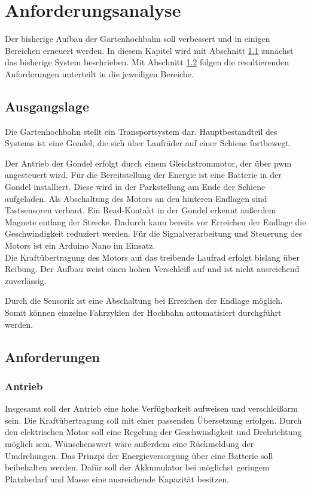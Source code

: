 \chapter{Anforderungsanalyse}
Der bisherige Aufbau der Gartenhochbahn soll verbessert und in einigen Bereichen erneuert werden. 
In diesem Kapitel wird mit Abschnitt \ref{sec:ausgangslage}
 zunächst das bisherige System beschrieben. 
Mit Abschnitt \ref{sec:anforderungen} folgen die resultierenden Anforderungen unterteilt in die jeweiligen Bereiche.  

\section{Ausgangslage}
\label{sec:ausgangslage}
Die Gartenhochbahn stellt ein Transportsystem dar. Hauptbestandteil des Systems ist eine Gondel, die sich über Laufräder 
auf einer Schiene fortbewegt. 

Der Antrieb der Gondel erfolgt durch einem Gleichstrommotor, der über \acrfull{pwm} angesteuert wird. Für die Bereitstellung der Energie ist eine Batterie in der Gondel installiert. Diese wird in der Parkstellung am Ende der Schiene aufgeladen. Als Abschaltung des Motors an den hinteren Endlagen sind Tastsensoren verbaut. Ein Read-Kontakt in der Gondel erkennt außerdem Magnete entlang der Strecke. Dadurch kann bereits vor Erreichen der Endlage die Geschwindigkeit reduziert werden. Für die Signalverarbeitung und Steuerung des Motors ist ein Arduino Nano im Einsatz. \\

Die Kraftübertragung des Motors auf das treibende Laufrad erfolgt bislang über Reibung. Der Aufbau weist einen hohen Verschleiß auf und ist nicht ausreichend zuverlässig. 

Durch die Sensorik ist eine Abschaltung bei Erreichen der Endlage möglich. Somit können einzelne Fahrzyklen der Hochbahn automatisiert durchgführt werden. 



\section{Anforderungen}
\label{sec:anforderungen}
\subsection{Antrieb}
Insgesamt soll der Antrieb eine hohe Verfügbarkeit aufweisen und verschleißarm sein. 
Die Kraftübertragung soll mit einer passenden Übersetzung erfolgen. Durch den elektrischen Motor soll eine Regelung der Geschwindigkeit und Drehrichtung möglich sein. Wünschenswert wäre außerdem eine Rückmeldung der Umdrehungen. 
Das Prinzpi der Energieversorgung über eine Batterie soll beibehalten werden. Dafür soll der Akkumulator bei möglichst geringem Platzbedarf und Masse eine ausreichende Kapazität besitzen. 

